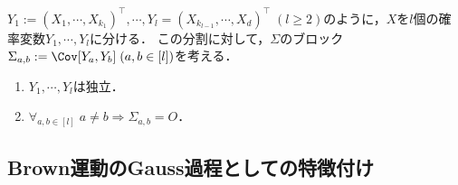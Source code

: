 \documentclass[uplatex,dvipdfmx]{jsreport}
\begin{document}
\begin{lemma}[多次元正規確率変数の成分間の独立性の特徴付け]
    $Y_1:=(X_1,\cdots,X_{k_1})^\top,\cdots,Y_l=(X_{k_{l-1}},\cdots,X_d)^\top\;(l\ge 2)$のように，$X$を$l$個の確率変数$Y_1,\cdots,Y_l$に分ける．
    この分割に対して，$\Sigma$のブロック$\Sigma_{a,b}:=\Cov[Y_a,Y_b]\;(a,b\in[l])$を考える．
    \begin{enumerate}
        \item $Y_1,\cdots,Y_l$は独立．
        \item $\forall_{a,b\in[l]}\;a\ne b\Rightarrow\Sigma_{a,b}=O$．
    \end{enumerate}
\end{lemma}

\subsection{Brown運動のGauss過程としての特徴付け}
\end{document}
